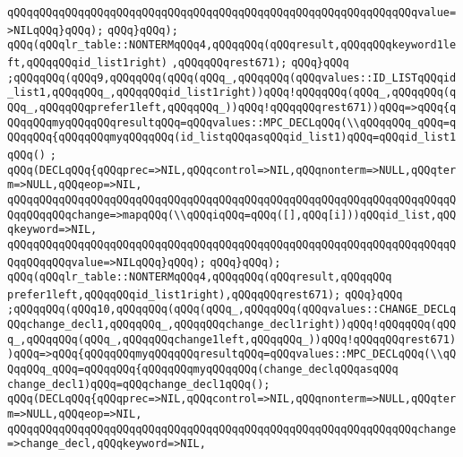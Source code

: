\verb|qQQqqQQqqQQqqQQqqQQqqQQqqQQqqQQqqQQqqQQqqQQqqQQqqQQqqQQqqQQqqQQqvalue=>NILqQQq}qQQq);|\newline
\verb|qQQq}qQQq);|\newline
\verb|qQQq(qQQqlr_table::NONTERMqQQq4,qQQqqQQq(qQQqresult,qQQqqQQqkeyword1left,qQQqqQQqid_list1right)|\newline
\verb|,qQQqqQQqrest671);|\newline
\verb|qQQq}qQQq|\newline
\verb|;qQQqqQQq(qQQq9,qQQqqQQq(qQQq(qQQq_,qQQqqQQq(qQQqvalues::ID_LISTqQQqid_list1,qQQqqQQq_,qQQqqQQqid_list1right))qQQq!qQQqqQQq(qQQq_,qQQqqQQq(qQQq_,qQQqqQQqprefer1left,qQQqqQQq_))qQQq!qQQqqQQqrest671))qQQq=>qQQq{qQQqqQQqmyqQQqqQQqresultqQQq=qQQqvalues::MPC_DECLqQQq(\\qQQqqQQq_qQQq=qQQqqQQq{qQQqqQQqmyqQQqqQQq(id_listqQQqasqQQqid_list1)qQQq=qQQqid_list1qQQq()|\newline
\verb|;|\newline
\verb|qQQq(DECLqQQq{qQQqprec=>NIL,qQQqcontrol=>NIL,qQQqnonterm=>NULL,qQQqterm=>NULL,qQQqeop=>NIL,|\newline
\verb|qQQqqQQqqQQqqQQqqQQqqQQqqQQqqQQqqQQqqQQqqQQqqQQqqQQqqQQqqQQqqQQqqQQqqQQqqQQqqQQqchange=>mapqQQq(\\qQQqiqQQq=qQQq([],qQQq[i]))qQQqid_list,qQQqkeyword=>NIL,|\newline
\verb|qQQqqQQqqQQqqQQqqQQqqQQqqQQqqQQqqQQqqQQqqQQqqQQqqQQqqQQqqQQqqQQqqQQqqQQqqQQqqQQqvalue=>NILqQQq}qQQq);|\newline
\verb|qQQq}qQQq);|\newline
\verb|qQQq(qQQqlr_table::NONTERMqQQq4,qQQqqQQq(qQQqresult,qQQqqQQq|\newline
\verb|prefer1left,qQQqqQQqid_list1right),qQQqqQQqrest671);|\newline
\verb|qQQq}qQQq|\newline
\verb|;qQQqqQQq(qQQq10,qQQqqQQq(qQQq(qQQq_,qQQqqQQq(qQQqvalues::CHANGE_DECLqQQqchange_decl1,qQQqqQQq_,qQQqqQQqchange_decl1right))qQQq!qQQqqQQq(qQQq_,qQQqqQQq(qQQq_,qQQqqQQqchange1left,qQQqqQQq_))qQQq!qQQqqQQqrest671))qQQq=>qQQq{qQQqqQQqmyqQQqqQQqresultqQQq=qQQqvalues::MPC_DECLqQQq(\\qQQqqQQq_qQQq=qQQqqQQq{qQQqqQQqmyqQQqqQQq(change_declqQQqasqQQq|\newline
\verb|change_decl1)qQQq=qQQqchange_decl1qQQq();|\newline
\verb|qQQq(DECLqQQq{qQQqprec=>NIL,qQQqcontrol=>NIL,qQQqnonterm=>NULL,qQQqterm=>NULL,qQQqeop=>NIL,|\newline
\verb|qQQqqQQqqQQqqQQqqQQqqQQqqQQqqQQqqQQqqQQqqQQqqQQqqQQqqQQqqQQqqQQqchange=>change_decl,qQQqkeyword=>NIL,|\newline
